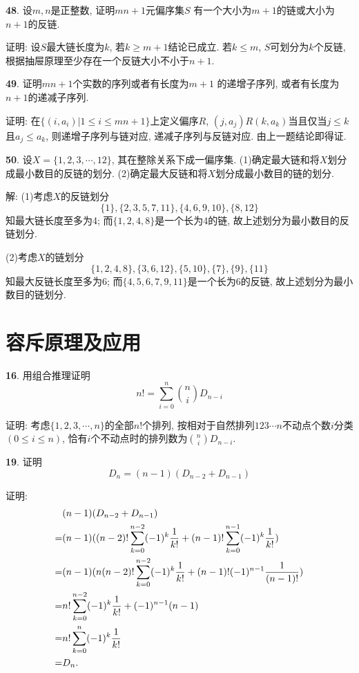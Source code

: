 \documentclass[12pt,a4paper]{article}
\begin{document}
\begin{CJK*}{GBK}{song}
\par \textbf{48}. 设$m,n$是正整数, 证明$mn+1$元偏序集$S$ 有一个大小为$m+1$的链或大小为$n+1$的反链.
\par 证明: 设$S$最大链长度为$k$, 若$k\ge m+1$结论已成立. 若$k\le m$, $S$可划分为$k$个反链, 根据抽屉原理至少存在一个反链大小不小于$n+1$.

\par \textbf{49}. 证明$mn+1$个实数的序列或者有长度为$m+1$ 的递增子序列, 或者有长度为$n+1$的递减子序列.
\par 证明: 在$\{(i,a_i)|1\le i\le mn+1\}$上定义偏序$R$, $(j,a_j)R(k,a_k)$当且仅当$j\le k$且$a_j\le a_k$, 则递增子序列与链对应, 递减子序列与反链对应. 由上一题结论即得证.

\par \textbf{50}. 设$X=\{1,2,3,\cdots,12\}$, 其在整除关系下成一偏序集. (1)确定最大链和将$X$划分成最小数目的反链的划分. (2)确定最大反链和将$X$划分成最小数目的链的划分.
\par 解: (1)考虑$X$的反链划分
\begin{displaymath}
\{1\},\{2,3,5,7,11\},\{4,6,9,10\},\{8,12\}
\end{displaymath}
知最大链长度至多为4; 而$\{1,2,4,8\}$是一个长为4的链, 故上述划分为最小数目的反链划分.
\par (2)考虑$X$的链划分
\begin{displaymath}
\{1,2,4,8\},\{3,6,12\},\{5,10\},\{7\},\{9\},\{11\}
\end{displaymath}
知最大反链长度至多为6; 而$\{4,5,6,7,9,11\}$是一个长为6的反链, 故上述划分为最小数目的链划分.

\section{容斥原理及应用}
\par \textbf{16}. 用组合推理证明
\begin{displaymath}
n!=\sum_{i=0}^n \binom{n}{i}D_{n-i}
\end{displaymath}
\par 证明: 考虑$\{1,2,3,\cdots,n\}$的全部$n!$个排列, 按相对于自然排列$123\cdots n$不动点个数$i$分类$(0\le i\le n)$, 恰有$i$个不动点时的排列数为$\binom{n}{i}D_{n-i}$.

\par \textbf{19}. 证明
\begin{displaymath}
D_n=(n-1)(D_{n-2}+D_{n-1})
\end{displaymath}
\par 证明:
\begin{align*}
&(n-1)(D_{n-2}+D_{n-1})\notag\\
=&(n-1)((n-2)!\sum_{k=0}^{n-2}(-1)^k\frac{1}{k!}+
(n-1)!\sum_{k=0}^{n-1}(-1)^k\frac{1}{k!})\notag\\
=&(n-1)(n(n-2)!\sum_{k=0}^{n-2}(-1)^k\frac{1}{k!}+
(n-1)!(-1)^{n-1}\frac{1}{(n-1)!})\notag\\
=&n!\sum_{k=0}^{n-2}(-1)^k\frac{1}{k!}+(-1)^{n-1}(n-1)\notag\\
=&n!\sum_{k=0}^{n}(-1)^k\frac{1}{k!}\notag\\
=&D_n. \notag
\end{align*}


\end{CJK*}
\end{document}
